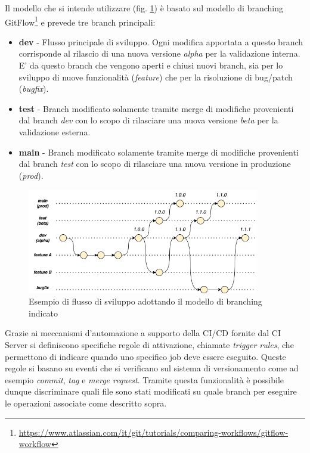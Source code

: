 Il modello che si intende utilizzare (fig. \ref{branching}) è basato sul modello di branching GitFlow\footnote{\href{https://www.atlassian.com/it/git/tutorials/comparing-workflows/gitflow-workflow}{https://www.atlassian.com/it/git/tutorials/comparing-workflows/gitflow-workflow}} e prevede tre branch principali:

\begin{itemize}
    \item \textbf{dev} - Flusso principale di sviluppo. Ogni modifica apportata a questo branch corrisponde al rilascio di una nuova versione \textit{alpha} per la validazione interna. E' da questo branch che vengono aperti e chiusi nuovi branch, sia per lo sviluppo di nuove funzionalità (\textit{feature}) che per la risoluzione di bug/patch (\textit{bugfix}).
    
    \item \textbf{test} - Branch modificato solamente tramite merge di modifiche provenienti dal branch \textit{dev} con lo scopo di rilasciare una nuova versione \textit{beta} per la validazione esterna.
    
    \item \textbf{main} - Branch modificato solamente tramite merge di modifiche provenienti dal branch \textit{test} con lo scopo di rilasciare una nuova versione in produzione (\textit{prod}).
\end{itemize}

\begin{figure}[H]
    \centering
    \includegraphics[width=0.9\textwidth]{img/branching-model.png}
    \caption{Esempio di flusso di sviluppo adottando il modello di branching indicato}
    \label{branching}
\end{figure}

Grazie ai meccanismi d'automazione a supporto della CI/CD fornite dal CI Server si definiscono specifiche regole di attivazione, 
chiamate \textit{trigger rules}, 
che permettono di indicare quando uno specifico job deve essere eseguito.
Queste regole si basano su eventi che si verificano sul sistema di versionamento come ad esempio \textit{commit}, 
\textit{tag} e \textit{merge request}. 
Tramite questa funzionalità è possibile dunque discriminare quali file sono stati modificati su quale branch per eseguire le operazioni associate come descritto sopra.

